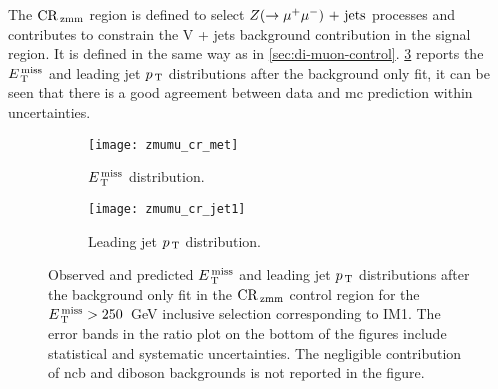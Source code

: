The $\mathrm{CR}_\mathrm{\, zmm}$ region is defined to select $Z (\rightarrow \mu^+ \mu^-)\mathrm{~+~jets}$ processes and
contributes to constrain the V + jets background contribution in the signal
region. It is defined in the same way as in
\cref{sec:di-muon-control}.
\cref{fig:dimu_cr_plots}
reports the $E_\mathrm{\, T}^\mathrm{\, miss}$ and
leading jet $p_\mathrm{\, T}$ distributions after the background only fit, it can be seen
that there is a good agreement between data and \gls{mc} prediction within
uncertainties.
\begin{figure}[!htb]
  \centering
  \begin{subfigure}[t]{.48\linewidth}
    \texttt{[image: zmumu\_cr\_met]}
    \caption{$E_\mathrm{\, T}^\mathrm{\, miss}$ distribution.}
    \label{fig:dimu_cr_met}
  \end{subfigure}
  \begin{subfigure}[t]{.48\linewidth}
    \texttt{[image: zmumu\_cr\_jet1]}
    \caption{Leading jet $p_\mathrm{\, T}$ distribution.}
    \label{fig:dimu_cr_jet1}
  \end{subfigure}
  \caption{Observed and predicted $E_\mathrm{\, T}^\mathrm{\, miss}$ and leading jet $p_\mathrm{\, T}$ distributions
    after the background only fit in the $\mathrm{CR}_\mathrm{\, zmm}$ control region for the
    $E_\mathrm{\, T}^\mathrm{\, miss} > 250$~GeV inclusive selection corresponding to IM1. The error bands
    in the ratio plot on the bottom of the figures include statistical and
    systematic uncertainties. The negligible contribution of \gls{ncb} and
    diboson backgrounds is not reported in the figure.}
  \label{fig:dimu_cr_plots}
\end{figure}
